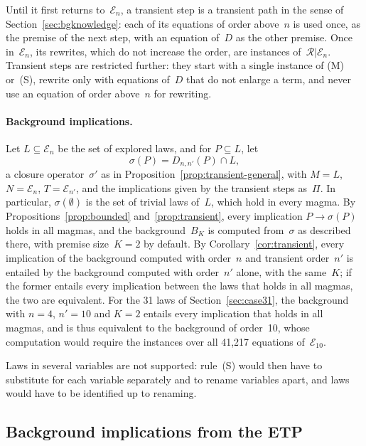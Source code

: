 \documentclass[11pt,a4paper]{article}
\theoremstyle{definition}
\theoremstyle{remark}
\begin{document}
Until it first returns to~$\mathcal{E}_n$, a transient step is a transient path in the sense of Section~\ref{sec:bgknowledge}: each of its equations of order above~$n$ is used once, as the premise of the next step, with an equation of~$D$ as the other premise. Once in~$\mathcal{E}_n$, its rewrites, which do not increase the order, are instances of~$\mathcal{R}|\mathcal{E}_n$. Transient steps are restricted further: they start with a single instance of (M) or~(S), rewrite only with equations of~$D$ that do not enlarge a term, and never use an equation of order above~$n$ for rewriting.

\paragraph{Background implications.}
Let $L \subseteq \mathcal{E}_n$ be the set of explored laws, and for $P \subseteq L$, let
\[
  \sigma(P) = D_{n,n'}(P) \cap L,
\]
a closure operator~$\sigma'$ as in Proposition~\ref{prop:transient-general}, with $M = L$, $N = \mathcal{E}_n$, $T = \mathcal{E}_{n'}$, and the implications given by the transient steps as~$\Pi$. In particular, $\sigma(\emptyset)$ is the set of trivial laws of~$L$, which hold in every magma. By Propositions~\ref{prop:bounded} and~\ref{prop:transient}, every implication $P \to \sigma(P)$ holds in all magmas, and the background~$B_K$ is computed from~$\sigma$ as described there, with premise size~$K = 2$ by default. By Corollary~\ref{cor:transient}, every implication of the background computed with order~$n$ and transient order~$n'$ is entailed by the background computed with order~$n'$ alone, with the same~$K$; if the former entails every implication between the laws that holds in all magmas, the two are equivalent. For the 31 laws of Section~\ref{sec:case31}, the background with $n = 4$, $n' = 10$ and $K = 2$ entails every implication that holds in all magmas, and is thus equivalent to the background of order~10, whose computation would require the instances over all 41,217 equations of~$\mathcal{E}_{10}$.

Laws in several variables are not supported: rule~(S) would then have to substitute for each variable separately and to rename variables apart, and laws would have to be identified up to renaming.

\subsection{Background implications from the ETP}\label{sec:etp}
\end{document}
